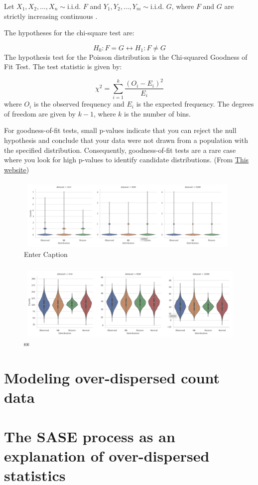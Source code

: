 Let \( X_1, X_2, \ldots, X_n \sim \text{i.i.d. } F \) and \( Y_1, Y_2, \ldots, Y_m \sim \text{i.i.d. } G \), where \( F \) and \( G \) are strictly increasing continuous .

The hypotheses for the chi-square test are:

\begin{equation}
    H_0: F = G \leftrightarrow   H_1: F \neq G
\end{equation}
The hypothesis test for the Poisson distribution is the Chi-squared Goodness of Fit Test. The test statistic is given by:

\begin{equation}
    \chi^2 = \sum_{i=1}^{k} \frac{(O_i - E_i)^2}{E_i}
\end{equation}
where \(O_i\) is the observed frequency and \(E_i\) is the expected frequency. The degrees of freedom are given by \(k-1\), where \(k\) is the number of bins.

For goodness-of-fit tests, small p-values indicate that you can reject the null hypothesis and conclude that your data were not drawn from a population with the specified distribution. Consequently, goodness-of-fit tests are a rare case where you look for high p-values to identify candidate distributions. 
(From \href{https://statisticsbyjim.com/hypothesis-testing/goodness-fit-tests-discrete-distributions/}{This website})


\begin{figure}[t]
    \centering
    \includegraphics[width=1\linewidth]{images/violin_plots_per_pulse.png}
    \caption{Enter Caption}
\end{figure}

\begin{figure}[htbp]
    \centering
    \includegraphics[width=1\linewidth]{images/violinplots_per_train.png}
    \caption{ss}
    \label{s}   
\end{figure}
\section{Modeling over-dispersed count data}

\section{The SASE process as an explanation of over-dispersed statistics}

